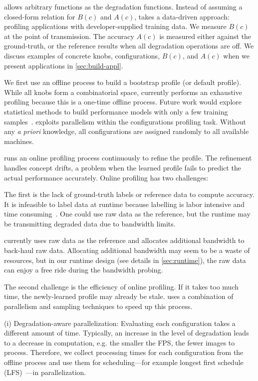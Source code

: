 \sysname{} allows arbitrary functions as the degradation functions. Instead of
assuming a closed-form relation for $B(c)$ and $A(c)$, \sysname{} takes a
data-driven approach: profiling applications with developer-supplied training
data.  We measure $B(c)$ at the point of transmission. The accuracy $A(c)$ is
measured either against the ground-truth, or the reference results when all
degradation operations are off.  We discuss examples of concrete knobs,
configurations, $B(c)$, and $A(c)$ when we present applications in
\autoref{sec:build-appl}.

 We first use an offline process to build a bootstrap
profile (or default profile). While all knobs form a combinatorial space,
\sysname{} currently performs an exhaustive profiling because this is a one-time
offline process. Future work would explore statistical methods to build
performance models with only a few training
samples~\cite{venkataraman2016ernest}. \sysname{} exploits parallelism within
the configurations profiling task. Without any \textit{a priori} knowledge, all
configurations are assigned randomly to all available machines.

 \sysname{} runs an online profiling process
continuously to refine the profile. The refinement handles concept drifts, a
problem when the learned profile fails to predict the actual performance
accurately. Online profiling has two challenges:

The first is the lack of ground-truth labels or reference data to compute
accuracy. It is infeasible to label data at runtime because labelling is labor
intensive and time consuming~\cite{russell2008labelme}. One could use raw data
as the reference, but the runtime may be transmitting degraded data due to
bandwidth limits.

\sysname{} currently uses raw data as the reference and allocates additional
bandwidth to back-haul raw data. Allocating additional bandwidth may seem to be
a waste of resources, but in our runtime design (see details in
\autoref{sec:runtime}), the raw data can enjoy a free ride during the bandwidth
probing.

The second challenge is the efficiency of online profiling. If it takes too much
time, the newly-learned profile may already be stale. \sysname{} uses a
combination of parallelism and sampling techniques to speed up this process.

(i) Degradation-aware parallelization: Evaluating each configuration takes a
different amount of time. Typically, an increase in the level of degradation
leads to a decrease in computation, e.g. the smaller the FPS, the fewer images
to process. Therefore, we collect processing times for each configuration from
the offline process and use them for scheduling---for example longest first
schedule (LFS)~\cite{karger2010scheduling}---in parallelization.

